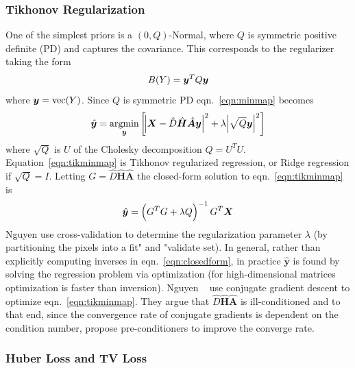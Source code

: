 \subsubsection{Tikhonov Regularization}

One of the simplest priors is a \((0, Q)\)-Normal, where \(Q\) is symmetric positive definite (PD) and captures the covariance.
%
This corresponds to the regularizer taking the form
\begin{equation}
    B(Y) = \bm{y} ^T Q \bm{y}
\end{equation}
where \(\bm{y} = \text{vec}(Y)\).
%
Since \(Q\) is symmetric PD eqn.~\eqref{eqn:minmap} becomes
\begin{equation}
    \hat{\bm{y}} = \underset{\bm{y}}{\text{argmin}}\left[ \abs{ \bm{X} - \hat{D} \hat{\bm{H}} \hat{\bm{A}} \bm{y} }^2 +\lambda \abs{ \sqrt{Q}\bm{y} }^2 \right]
    \label{eqn:tikminmap}
\end{equation}
where \(\sqrt{Q}\) is \(U\) of the Cholesky decomposition \(Q = U^T U\).
%
Equation~\ref{eqn:tikminmap} is Tikhonov regularized regression, or Ridge regression if \(\sqrt{Q} = I\).
%
Letting \(G = \hat{D} \hat{\bm{H}} \hat{\bm{A}}\) the closed-form solution to eqn.~\eqref{eqn:tikminmap} is
\begin{equation}
    \hat{\bm{y}} = \left( G^T G + \lambda Q \right)^{-1} G^T\bm{X}
    \label{eqn:closedform}
\end{equation}
Nguyen \etal\cite{milanfar2001} use cross-validation to determine the regularization parameter \(\lambda\) (by partitioning the pixels into a fit" and "validate set).
%
In general, rather than explicitly computing inverses in eqn.~\eqref{eqn:closedform}, in practice \(\hat{\bm{y}}\) is found by solving the regression problem via optimization (for high-dimensional matrices optimization is faster than inversion).
%
Nguyen \etal~ use conjugate gradient descent to optimize eqn.~\eqref{eqn:tikminmap}.
%
They argue that \(\hat{D} \hat{\bm{H}} \hat{\bm{A}}\) is ill-conditioned and to that end, since the convergence rate of conjugate gradients is dependent on the condition number\cite{vanderSluis1986}, propose pre-conditioners to improve the converge rate.

\subsubsection{Huber Loss and TV Loss}


